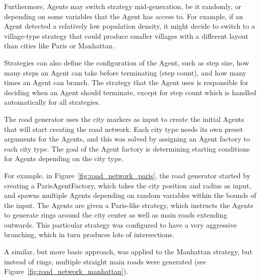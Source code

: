 Furthermore, Agents may switch strategy mid-generation, be it randomly, or depending on some variables that the Agent has access to.
For example, if an Agent detected a relatively low population density, it might decide to switch to a village-type strategy that could produce smaller villages with a different layout than cities like Paris or Manhattan.

Strategies can also define the configuration of the Agent, such as step size, how many steps an Agent can take before terminating (step count), and how many times an Agent can branch.
The strategy that the Agent uses is responsible for deciding when an Agent should terminate, except for step count which is handled automatically for all strategies.

The road generator uses the city markers as input to create the initial Agents that will start creating the road network.
Each city type needs its own preset arguments for the Agents, and this was solved by assigning an Agent factory to each city type.
The goal of the Agent factory is determining starting conditions for Agents depending on the city type.

For example, in Figure~\ref{fig:road_network_paris}, the road generator started by creating a ParisAgentFactory, which takes the city position and radius as input, and spawns multiple Agents depending on random variables within the bounds of the input.
The Agents are given a Paris-like strategy, which instructs the Agents to generate rings around the city center as well as main roads extending outwards.
This particular strategy was configured to have a very aggressive branching, which in turn produces lots of intersections.

A similar, but more basic approach, was applied to the Manhattan strategy, but instead of rings, multiple straight main roads were generated (see Figure~\ref{fig:road_network_manhattan}).

